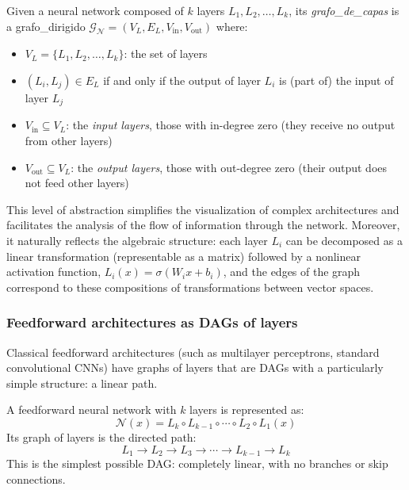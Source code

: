 \begin{definition}\label{def:grafo_de_capas}
Given a neural network composed of $k$ layers $L_1, L_2, \ldots, L_k$, its \textit{\gls{grafo_de_capas}} is a \gls{grafo_dirigido} $\mathcal{G}_{\mathcal{N}} = (V_L, E_L, V_{\text{in}}, V_{\text{out}})$ where:
\begin{itemize}
    \item $V_L = \{L_1, L_2, \ldots, L_k\}$: the set of layers
    \item $(L_i, L_j) \in E_L$ if and only if the output of layer $L_i$ is (part of) the input of layer $L_j$
    \item $V_{\text{in}} \subseteq V_L$: the \textit{input layers}, those with in-degree zero (they receive no output from other layers)
    \item $V_{\text{out}} \subseteq V_L$: the \textit{output layers}, those with out-degree zero (their output does not feed other layers)
\end{itemize}
\end{definition}

This level of abstraction simplifies the visualization of complex architectures and facilitates the analysis of the flow of information through the network. Moreover, it naturally reflects the algebraic structure: each layer $L_i$ can be decomposed as a linear transformation (representable as a matrix) followed by a nonlinear activation function, $L_i(x) = \sigma(W_i x + b_i)$, and the edges of the graph correspond to these compositions of transformations between vector spaces.

\subsubsection[Feedforward architectures as DAGs of layers]{Feedforward architectures as \glspl{DAG} of layers}

Classical feedforward architectures (such as multilayer perceptrons, standard convolutional \glspl{CNN}) have graphs of layers that are \glspl{DAG} with a particularly simple structure: a linear path.

\begin{example}
A feedforward neural network with $k$ layers is represented as:
\[
\mathcal{N}(x) = L_k \circ L_{k-1} \circ \cdots \circ L_2 \circ L_1(x)
\]
Its graph of layers is the directed path:
\[
L_1 \to L_2 \to L_3 \to \cdots \to L_{k-1} \to L_k
\]
This is the simplest possible \gls{DAG}: completely linear, with no branches or skip connections.
\end{example}


